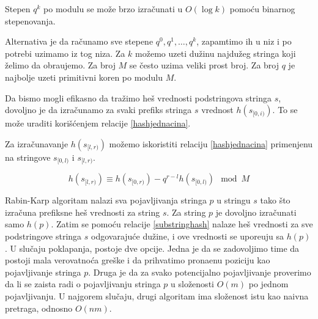 Stepen $q^k$ po modulu se mo\v ze brzo izra\v cunati u $O(\log k)$ pomo\' cu binarnog stepenovanja.

\noindent
\begin{minipage}[l]{\textwidth}

\end{minipage}

Alternativa je da ra\v cunamo sve stepene $q^0, q^1, \ldots, q^k$, zapamtimo ih u niz i po potrebi uzimamo iz tog niza. Za $k$ mo\v zemo uzeti du\v zinu najdu\v zeg stringa koji \v zelimo da obra\dj ujemo. Za broj $M$ se \v cesto uzima veliki prost broj. Za broj $q$ je najbolje uzeti primitivni koren po modulu $M$.

\noindent
\begin{minipage}[l]{\textwidth}

\end{minipage}

Da bismo mogli efikasno da tra\v zimo he\v s vrednosti podstringova stringa $s$, dovoljno je da izra\v cunamo za svaki prefiks stringa $s$ vrednost $h(s_{[0,i)})$. To se mo\v ze uraditi kori\v s\' cenjem relacije \ref{hashjednacina}.

\noindent
\begin{minipage}[l]{\textwidth}

\end{minipage}

Za izra\v cunavanje $h(s_{[l, r)})$ mo\v zemo iskoristiti relaciju \ref{hashjednacina} primenjenu na stringove $s_{[0,l)}$ i $s_{[l,r)}$.

\begin{equation}
\label{substringhash}
    h(s_{[l, r)}) \equiv h(s_{[0, r)}) - q^{r-l}h(s_{[0, l)}) \mod M
\end{equation}

Rabin-Karp algoritam nalazi sva pojavljivanja stringa $p$ u stringu $s$ tako \v sto izra\v cuna prefiksne he\v s vrednosti za string $s$. Za string $p$ je dovoljno izra\v cunati samo $h(p)$. Zatim se pomo\' cu relacije \ref{substringhash} nalaze he\v s vrednosti za sve podstringove stringa $s$ odgovaraju\' ce du\v zine, i ove vrednosti se upore\dj uju sa $h(p)$. U slu\v caju poklapanja, postoje dve opcije. Jedna je da se zadovoljimo time da postoji mala verovatno\' ca gre\v ske i da prihvatimo prona\dj enu poziciju kao pojavljivanje stringa $p$. Druga je da za svako potencijalno pojavljivanje proverimo da li se zaista radi o pojavljivanju stringa $p$ u slo\v zenosti $O(m)$ po jednom pojavljivanju. U najgorem slu\v caju, drugi algoritam ima slo\v zenost istu kao naivna pretraga, odnosno $O(nm)$.

